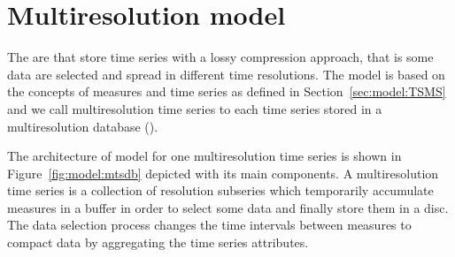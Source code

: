 







\section{Multiresolution model}
\label{sec:MTSMS}


The  are  that store time series with a lossy
compression approach, that is some data are selected and spread
in different time resolutions. The  model is based on the
concepts of measures and time series as defined in
Section~\ref{sec:model:TSMS} and we call multiresolution time series
to each time series stored in a multiresolution database
().


The architecture of  model for one multiresolution time series is
shown in Figure~\ref{fig:model:mtsdb} depicted with its main
components.  A multiresolution time series is a collection of
resolution subseries which temporarily accumulate measures in a buffer
in order to select some data and finally store them in a
disc. The data selection process changes the time intervals
between measures to compact data by aggregating the time series
attributes.

